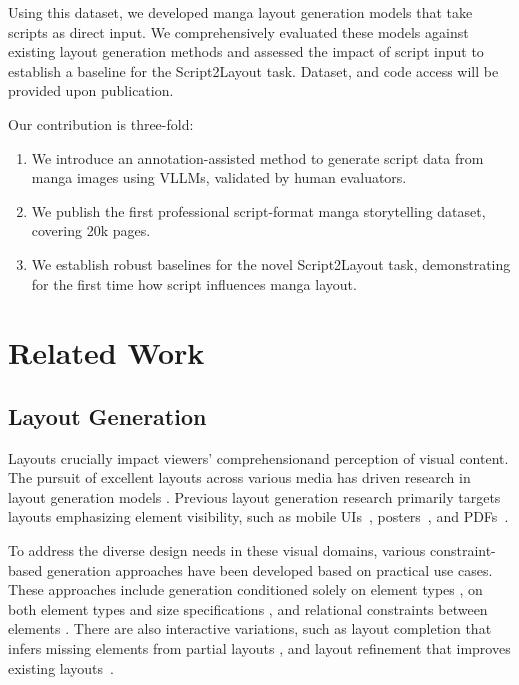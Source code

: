 \documentclass[sigconf, screen, review, anonymous]{acmart}
\begin{document}
Using this dataset, we developed manga layout generation models that take scripts as direct input.
We comprehensively evaluated these models against existing layout generation methods and assessed the impact of script input to establish a baseline for the Script2Layout task. Dataset, and code access will be provided upon publication.

Our contribution is three-fold:
\begin{enumerate}
    \item We introduce an annotation-assisted method to generate script data from manga images using VLLMs, validated by human evaluators.
    \item We publish the first professional script-format manga storytelling dataset, covering 20k pages.
    \item We establish robust baselines for the novel Script2Layout task, demonstrating for the first time how script influences manga layout.
\end{enumerate}

\section{Related Work}
\subsection{Layout Generation}

Layouts crucially impact viewers' comprehensionand perception of visual content. The pursuit of excellent layouts across various media has driven research in layout generation models \cite{shi_intelligent_2023,shi_understanding_2023,huang_survey_2023}. Previous layout generation research primarily targets layouts emphasizing element visibility, such as mobile UIs~\cite{deka_rico_2017,jiang_coarse--fine_2022}, posters~\cite{seol_posterllama_2024,yang_posterllava_2024,tanaka_scipostlayout_2024, advertising_posters}, and PDFs~\cite{zhong_publaynet_2019,jiang_coarse--fine_2022}. 

To address the diverse design needs in these visual domains, various constraint-based generation approaches have been developed based on practical use cases. These approaches include generation conditioned solely on element types \cite{lee2020neural,jiang_layoutformer_2023}, on both element types and size specifications \cite{jiang_layoutformer_2023,kong2022blt}, and relational constraints between elements \cite{lee2020neural,kikuchi_constrained_2021}.
There are also interactive variations, such as layout completion that infers missing elements from partial layouts \cite{gupta2021layouttransformer}, and layout refinement that improves existing layouts~\cite{rahman2021ruite}. 
\end{document}
